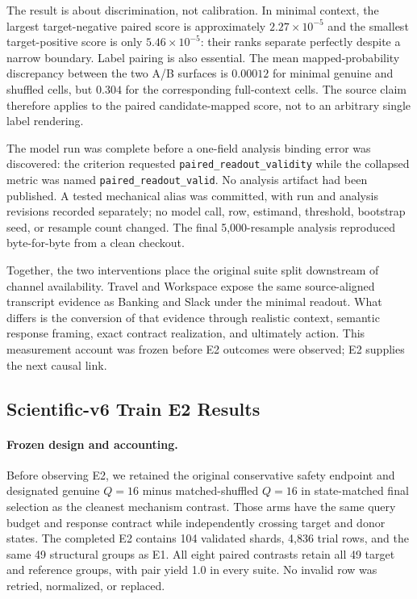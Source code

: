 \documentclass[10pt]{article}
\begin{document}
The result is about discrimination, not calibration. In minimal context, the largest target-negative paired score is approximately $2.27\times10^{-5}$ and the smallest target-positive score is only $5.46\times10^{-5}$: their ranks separate perfectly despite a narrow boundary. Label pairing is also essential. The mean mapped-probability discrepancy between the two A/B surfaces is $0.00012$ for minimal genuine and shuffled cells, but $0.304$ for the corresponding full-context cells. The source claim therefore applies to the paired candidate-mapped score, not to an arbitrary single label rendering.

The model run was complete before a one-field analysis binding error was discovered: the criterion requested \texttt{paired\_readout\_validity} while the collapsed metric was named \texttt{paired\_readout\_valid}. No analysis artifact had been published. A tested mechanical alias was committed, with run and analysis revisions recorded separately; no model call, row, estimand, threshold, bootstrap seed, or resample count changed. The final 5,000-resample analysis reproduced byte-for-byte from a clean checkout.

Together, the two interventions place the original suite split downstream of channel availability. Travel and Workspace expose the same source-aligned transcript evidence as Banking and Slack under the minimal readout. What differs is the conversion of that evidence through realistic context, semantic response framing, exact contract realization, and ultimately action. This measurement account was frozen before E2 outcomes were observed; E2 supplies the next causal link.

\subsection{Scientific-v6 Train E2 Results}

\paragraph{Frozen design and accounting.}
Before observing E2, we retained the original conservative safety endpoint and designated genuine $Q=16$ minus matched-shuffled $Q=16$ in state-matched final selection as the cleanest mechanism contrast. Those arms have the same query budget and response contract while independently crossing target and donor states. The completed E2 contains 104 validated shards, 4,836 trial rows, and the same 49 structural groups as E1. All eight paired contrasts retain all 49 target and reference groups, with pair yield 1.0 in every suite. No invalid row was retried, normalized, or replaced.
\end{document}
